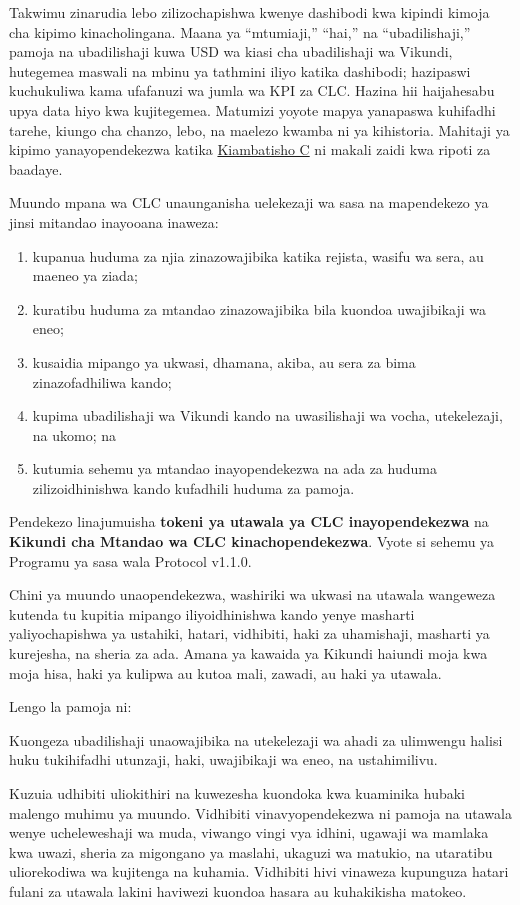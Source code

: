 \documentclass[11pt]{article}
\begin{document}
Takwimu zinarudia lebo zilizochapishwa kwenye dashibodi kwa kipindi kimoja cha kipimo kinacholingana. Maana ya ``mtumiaji,'' ``hai,'' na ``ubadilishaji,'' pamoja na ubadilishaji kuwa USD wa kiasi cha ubadilishaji wa Vikundi, hutegemea maswali na mbinu ya tathmini iliyo katika dashibodi; hazipaswi kuchukuliwa kama ufafanuzi wa jumla wa KPI za CLC. Hazina hii haijahesabu upya data hiyo kwa kujitegemea. Matumizi yoyote mapya yanapaswa kuhifadhi tarehe, kiungo cha chanzo, lebo, na maelezo kwamba ni ya kihistoria. Mahitaji ya kipimo yanayopendekezwa katika \href{https://docs.cosmolocal.credit/sw/white-paper/appendix-c-kpi-definitions}{Kiambatisho C} ni makali zaidi kwa ripoti za baadaye.

Muundo mpana wa CLC unaunganisha uelekezaji wa sasa na mapendekezo ya jinsi mitandao inayooana inaweza:

\begin{enumerate}[leftmargin=*]
\item kupanua huduma za njia zinazowajibika katika rejista, wasifu wa sera, au maeneo ya ziada;
\item kuratibu huduma za mtandao zinazowajibika bila kuondoa uwajibikaji wa eneo;
\item kusaidia mipango ya ukwasi, dhamana, akiba, au sera za bima zinazofadhiliwa kando;
\item kupima ubadilishaji wa Vikundi kando na uwasilishaji wa vocha, utekelezaji, na ukomo; na
\item kutumia sehemu ya mtandao inayopendekezwa na ada za huduma zilizoidhinishwa kando kufadhili huduma za pamoja.
\end{enumerate}
Pendekezo linajumuisha \textbf{tokeni ya utawala ya CLC inayopendekezwa} na \textbf{Kikundi cha Mtandao wa CLC kinachopendekezwa}. Vyote si sehemu ya Programu ya sasa wala Protocol v1.1.0.

Chini ya muundo unaopendekezwa, washiriki wa ukwasi na utawala wangeweza kutenda tu kupitia mipango iliyoidhinishwa kando yenye masharti yaliyochapishwa ya ustahiki, hatari, vidhibiti, haki za uhamishaji, masharti ya kurejesha, na sheria za ada. Amana ya kawaida ya Kikundi haiundi moja kwa moja hisa, haki ya kulipwa au kutoa mali, zawadi, au haki ya utawala.

Lengo la pamoja ni:

Kuongeza ubadilishaji unaowajibika na utekelezaji wa ahadi za ulimwengu halisi huku tukihifadhi utunzaji, haki, uwajibikaji wa eneo, na ustahimilivu.

Kuzuia udhibiti uliokithiri na kuwezesha kuondoka kwa kuaminika hubaki malengo muhimu ya muundo. Vidhibiti vinavyopendekezwa ni pamoja na utawala wenye ucheleweshaji wa muda, viwango vingi vya idhini, ugawaji wa mamlaka kwa uwazi, sheria za migongano ya maslahi, ukaguzi wa matukio, na utaratibu uliorekodiwa wa kujitenga na kuhamia. Vidhibiti hivi vinaweza kupunguza hatari fulani za utawala lakini haviwezi kuondoa hasara au kuhakikisha matokeo.
\end{document}
